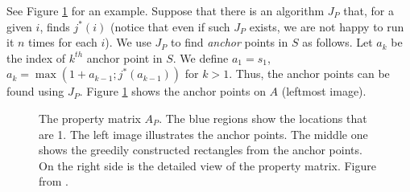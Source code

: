 \documentclass{article}
\begin{document}
See Figure \ref{fig:property_matrix} for an example. Suppose that
there is an algorithm $J_P$ that, for a given $i$, finds $j^*(i)$
(notice that even if such $J_P$ exists, we are not happy to run it
$n$ times for each $i$). We use $J_P$ to find \textit{anchor} points
in $S$ as follows. Let $a_k$ be the index of $k^{th}$ anchor point
in $S$. We define $a_1 = s_1$, $a_k = \max(1 + a_{k-1}; j^*(a_{k-1}))$
for $k > 1$. Thus, the anchor points can be found using $J_P$.
Figure \ref{fig:property_matrix} shows the anchor points on $A$
(leftmost image).

\begin{figure}
    \centering
    \label{fig:property_matrix}
    \caption{The property matrix $A_P$. The blue regions show the locations that are 1. The left image illustrates the anchor points. The middle one shows the greedily constructed rectangles from the anchor points. On the right side is the detailed view of the property matrix. Figure from \cite{bokal2015}.}
\end{figure}
\end{document}
